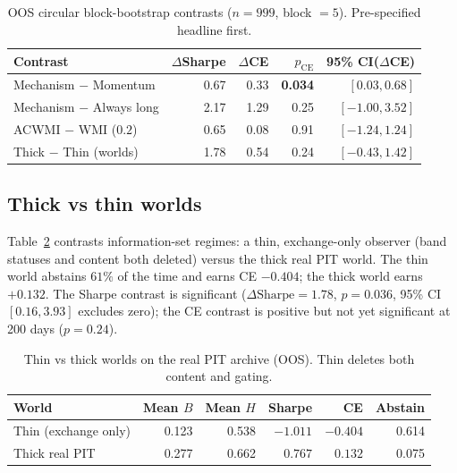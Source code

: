 \documentclass[12pt]{article}
\begin{document}
\begin{table}[t]
\centering
\caption{OOS circular block-bootstrap contrasts ($n=999$, block $=5$). Pre-specified headline first.}
\label{tab:boot}
\begin{tabular}{lrrrr}
\toprule
Contrast & $\Delta$Sharpe & $\Delta$CE & $p_{\mathrm{CE}}$ & 95\% CI($\Delta$CE) \\
\midrule
Mechanism $-$ Momentum & 0.67 & 0.33 & \textbf{0.034} & $[0.03,0.68]$ \\
Mechanism $-$ Always long & 2.17 & 1.29 & 0.25 & $[-1.00,3.52]$ \\
ACWMI $-$ WMI ($0.2$) & 0.65 & 0.08 & 0.91 & $[-1.24,1.24]$ \\
Thick $-$ Thin (worlds) & 1.78 & 0.54 & 0.24 & $[-0.43,1.42]$ \\
\bottomrule
\end{tabular}
\end{table}

\subsection{Thick vs thin worlds}
Table~\ref{tab:thin} contrasts information-set regimes: a thin, exchange-only observer (band statuses and content both deleted) versus the thick real PIT world. The thin world abstains $61\%$ of the time and earns CE $-0.404$; the thick world earns $+0.132$. The Sharpe contrast is significant ($\Delta\mathrm{Sharpe}=1.78$, $p=0.036$, 95\% CI $[0.16,3.93]$ excludes zero); the CE contrast is positive but not yet significant at 200 days ($p=0.24$).

\begin{table}[t]
\centering
\caption{Thin vs thick worlds on the real PIT archive (OOS). Thin deletes both content and gating.}
\label{tab:thin}
\begin{tabular}{lrrrrr}
\toprule
World & Mean $B$ & Mean $H$ & Sharpe & CE & Abstain \\
\midrule
Thin (exchange only) & 0.123 & 0.538 & $-1.011$ & $-0.404$ & 0.614 \\
Thick real PIT & 0.277 & 0.662 & $0.767$ & $0.132$ & 0.075 \\
\bottomrule
\end{tabular}
\end{table}
\end{document}

